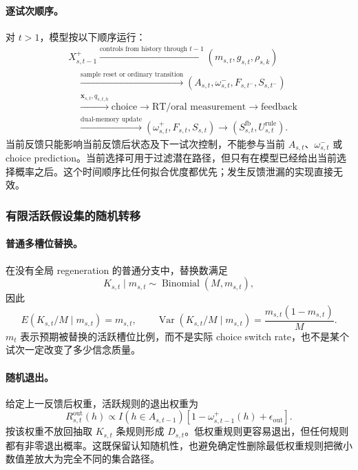 \paragraph{逐试次顺序。}
对 $t>1$，模型按以下顺序运行：
\begin{equation}
\begin{aligned}
&X^+_{s,t-1}
\xrightarrow{\text{controls from history through }t-1}
(m_{s,t},g_{s,t},\rho_{s,k})\\
&\quad\xrightarrow{\text{sample reset or ordinary transition}}
(A_{s,t},\omega^-_{s,t},F_{s,t^-},S_{s,t^-})\\
&\quad\xrightarrow{\mathbf x_{s,t},q_{s,t,h}}
\text{choice}
\longrightarrow \text{RT/oral measurement}
\longrightarrow \text{feedback}\\
&\quad\xrightarrow{\text{dual-memory update}}
(\omega^+_{s,t},F_{s,t},S_{s,t})
\longrightarrow
(S^{\mathrm{fb}}_{s,t},U^{\mathrm{rule}}_{s,t}).
\end{aligned}
\label{eq:model0805-trial-order}
\end{equation}
当前反馈只能影响当前反馈后状态及下一试次控制，不能参与当前 $A_{s,t}$、$\omega^-_{s,t}$ 或 choice prediction。当前选择可用于过滤潜在路径，但只有在模型已经给出当前选择概率之后。这个时间顺序比任何拟合优度都优先；发生反馈泄漏的实现直接无效。


\subsubsection{有限活跃假设集的随机转移}

\paragraph{普通多槽位替换。}
在没有全局 regeneration 的普通分支中，替换数满足
\begin{equation}
    K_{s,t}\mid m_{s,t}
    \sim\operatorname{Binomial}(M,m_{s,t}),
    \label{eq:model0805-replacement-count}
\end{equation}
因此
\begin{equation}
    E(K_{s,t}/M\mid m_{s,t})=m_{s,t},
    \qquad
    \operatorname{Var}(K_{s,t}/M\mid m_{s,t})
    =\frac{m_{s,t}(1-m_{s,t})}{M}.
    \label{eq:model0805-replacement-moments}
\end{equation}
$m_t$ 表示预期被替换的活跃槽位比例，而不是实际 choice switch rate，也不是某个试次一定改变了多少信念质量。

\paragraph{随机退出。}
给定上一反馈后权重，活跃规则的退出权重为
\begin{equation}
    R^{\mathrm{out}}_{s,t}(h)
    \propto I(h\in A_{s,t-1})
    [1-\omega^+_{s,t-1}(h)+\epsilon_{\mathrm{out}}].
    \label{eq:model0805-exit-kernel}
\end{equation}
按该权重不放回抽取 $K_{s,t}$ 条规则形成 $D_{s,t}$。低权重规则更容易退出，但任何规则都有非零退出概率。这既保留认知随机性，也避免确定性删除最低权重规则把微小数值差放大为完全不同的集合路径。

